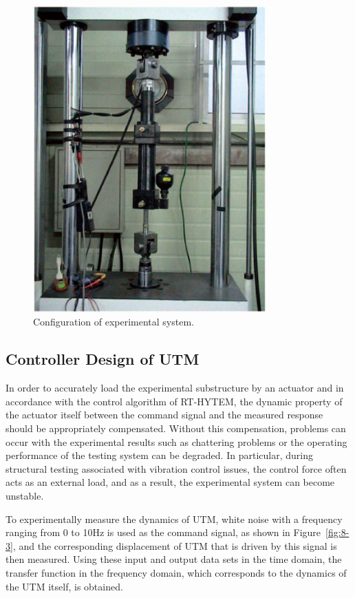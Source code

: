 \begin{figure}[!ht]
\centering
\includegraphics[width=0.8\textwidth] {figure/8-2.eps}
\caption{Configuration of experimental system.}
\label{fig:8-2}
\end{figure}


\subsection{Controller Design of UTM}
In order to accurately load the experimental substructure by an actuator and in accordance with the control algorithm of RT-HYTEM, the dynamic property of the actuator itself between the command signal and the measured response should be appropriately compensated. Without this compensation, problems can occur with the experimental results such as chattering problems or the operating performance of the testing system can be degraded. In particular, during structural testing associated with vibration control issues, the control force often acts as an external load, and as a result, the experimental system can become unstable.

To experimentally measure the dynamics of UTM, white noise with a frequency ranging from 0 to 10Hz is used as the command signal, as shown in Figure~\ref{fig:8-3}, and the corresponding displacement of UTM that is driven by this signal is then measured. Using these input and output data sets in the time domain, the transfer function in the frequency domain, which corresponds to the dynamics of the UTM itself, is obtained.


